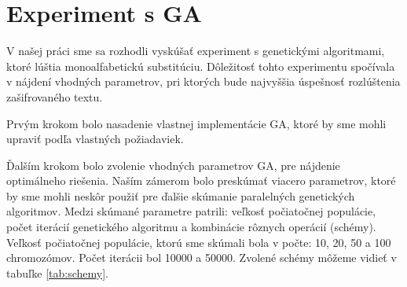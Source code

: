 \section{Experiment s GA}
V našej práci sme sa rozhodli vyskúšať experiment s genetickými algoritmami, ktoré lúštia monoalfabetickú substitúciu.
Dôležitosť tohto experimentu spočívala v nájdení vhodných parametrov, pri ktorých bude najvyššia úspešnosť rozlúštenia zašifrovaného textu.

Prvým krokom bolo nasadenie vlastnej implementácie GA, ktoré by sme mohli upraviť podľa vlastných požiadaviek.

Ďalším krokom bolo zvolenie vhodných parametrov GA, pre nájdenie optimálneho riešenia.
Naším zámerom bolo preskúmať viacero parametrov, ktoré by sme mohli neskôr použiť pre ďalšie skúmanie paralelných genetických algoritmov. 
Medzi skúmané parametre patrili: veľkosť počiatočnej populácie, počet iterácií genetického algoritmu a kombinácie rôznych operácií (schémy).
Veľkosť počiatočnej populácie, ktorú sme skúmali bola v počte: 10, 20, 50 a 100 chromozómov. Počet iterácii bol 10000 a 50000. 
Zvolené schémy môžeme vidieť v tabuľke \ref{tab:schemy}.


